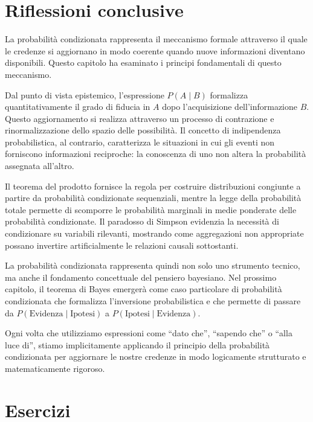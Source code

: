 \documentclass[
  letterpaper,
  DIV=11,
  numbers=noendperiod,
  oneside]{scrreprt}
\theoremstyle{definition}
\theoremstyle{plain}
\theoremstyle{definition}
\theoremstyle{remark}
\begin{document}
\section*{Riflessioni conclusive}\label{riflessioni-conclusive-3}


La probabilità condizionata rappresenta il meccanismo formale attraverso
il quale le credenze si aggiornano in modo coerente quando nuove
informazioni diventano disponibili. Questo capitolo ha esaminato i
principi fondamentali di questo meccanismo.

Dal punto di vista epistemico, l'espressione \(P(A \mid B)\) formalizza
quantitativamente il grado di fiducia in \(A\) dopo l'acquisizione
dell'informazione \(B\). Questo aggiornamento si realizza attraverso un
processo di contrazione e rinormalizzazione dello spazio delle
possibilità. Il concetto di indipendenza probabilistica, al contrario,
caratterizza le situazioni in cui gli eventi non forniscono informazioni
reciproche: la conoscenza di uno non altera la probabilità assegnata
all'altro.

Il teorema del prodotto fornisce la regola per costruire distribuzioni
congiunte a partire da probabilità condizionate sequenziali, mentre la
legge della probabilità totale permette di scomporre le probabilità
marginali in medie ponderate delle probabilità condizionate. Il
paradosso di Simpson evidenzia la necessità di condizionare su variabili
rilevanti, mostrando come aggregazioni non appropriate possano invertire
artificialmente le relazioni causali sottostanti.

La probabilità condizionata rappresenta quindi non solo uno strumento
tecnico, ma anche il fondamento concettuale del pensiero bayesiano. Nel
prossimo capitolo, il teorema di Bayes emergerà come caso particolare di
probabilità condizionata che formalizza l'inversione probabilistica e
che permette di passare da \(P(\text{Evidenza} \mid \text{Ipotesi})\) a
\(P(\text{Ipotesi} \mid \text{Evidenza})\).

Ogni volta che utilizziamo espressioni come ``dato che'', ``sapendo
che'' o ``alla luce di'', stiamo implicitamente applicando il principio
della probabilità condizionata per aggiornare le nostre credenze in modo
logicamente strutturato e matematicamente rigoroso.

\section*{Esercizi}\label{esercizi-1}
\end{document}
